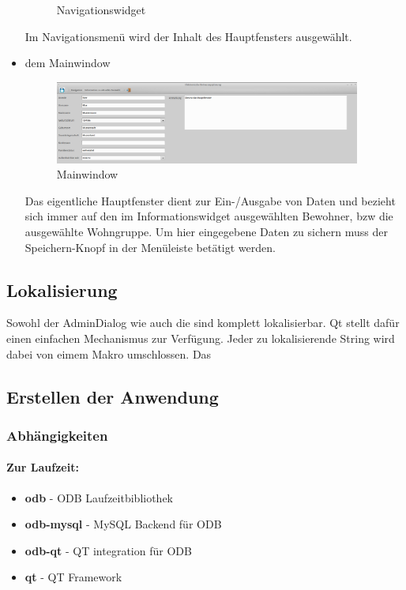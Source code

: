 \begin{itemize}
\begin{figure}[h]
\begin{center}
			\caption{Navigationswidget}
			\label{Navigationsmenü}
		\end{center}
	\end{figure}
	\FloatBarrier
	\noindent
	Im Navigationsmenü wird der Inhalt des Hauptfensters ausgewählt.
	\item dem Mainwindow
	\begin{figure}[h]
		\begin{center}
			\includegraphics[keepaspectratio=true, width=0.95\textwidth]{pics/client_main.png}
			\caption{Mainwindow}
			\label{Hauptfenster}
		\end{center}
	\end{figure}
	\FloatBarrier
	\noindent
	Das eigentliche Hauptfenster dient zur Ein-/Ausgabe von Daten und bezieht sich immer auf den im Informationswidget ausgewählten Bewohner, bzw die ausgewählte Wohngruppe. Um hier eingegebene Daten zu sichern muss der Speichern-Knopf in der Menüleiste betätigt werden.
\end{itemize}

\newpage
\subsection{Lokalisierung}
Sowohl der AdminDialog wie auch die \EBP sind komplett lokalisierbar. Qt stellt dafür einen einfachen Mechanismus zur Verfügung. Jeder zu lokalisierende String wird dabei von eimem Makro umschlossen. Das 
\subsection{Erstellen der Anwendung}
\subsubsection{Abhängigkeiten}
\paragraph{Zur Laufzeit:}
\begin{itemize}
	\item \textbf{odb} - ODB Laufzeitbibliothek
	\item \textbf{odb-mysql} - MySQL Backend für ODB
	\item \textbf{odb-qt} - QT integration für ODB
	\item \textbf{qt} - QT Framework
\end{itemize}
